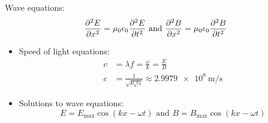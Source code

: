 \documentclass[10pt, twocolumn]{article}
\begin{document}
Wave equations:
\[
  \frac{\partial^{2} E}{\partial x^{2}} = \mu_0 \epsilon_0 \frac{\partial^{2} E}{\partial t^{2}} \text{ and } \frac{\partial^{2} B}{\partial x^{2}} = \mu_0 \epsilon_0 \frac{\partial^{2} B}{\partial t^{2}}
\]
\begin{itemize}
  \item Speed of light equations:
        \begin{align*}
          c & = \lambda f = \frac{\omega}{k} = \frac{E}{B}                                   \\
          c & = \frac{1}{\sqrt{\mu_0 \epsilon_0 }} \approx \SI{2.9979 e8}{\metre\per\second}
        \end{align*}
  \item Solutions to wave equations:
        \[
          E = E_{\mathrm{max}}\cos\left( kx - \omega t \right) \text{ and } B = B_{\mathrm{max}}\cos\left( kx - \omega t \right)
        \]
\end{itemize}
\end{document}
